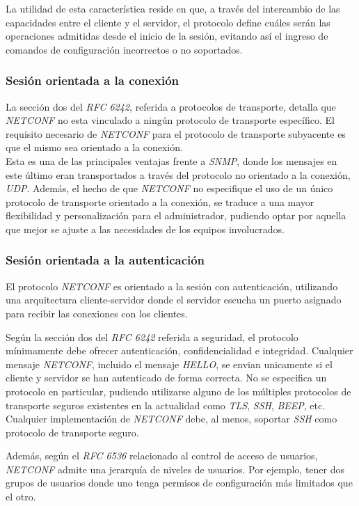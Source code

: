   La utilidad de esta característica reside en que, a través del intercambio de las capacidades entre el cliente y el servidor, el protocolo define cuáles serán las operaciones admitidas desde el inicio de la sesión, evitando así el ingreso de comandos de configuración incorrectos o no soportados. 


  \subsubsection{Sesión orientada a la conexión}
  La sección dos del \textit{RFC 6242}, referida a protocolos de transporte, detalla que \textit{NETCONF} no esta vinculado a ningún protocolo de transporte específico. El requisito necesario de \textit{NETCONF} para el protocolo de transporte subyacente es que el mismo sea orientado a la conexión. 
  \\

  Esta es una de las principales ventajas frente a \textit{SNMP}, donde los mensajes en este último eran transportados a través del protocolo no orientado a la conexión, \textit{UDP}. Además, el hecho de que \textit{NETCONF} no especifique el uso de un único protocolo de transporte orientado a la conexión, se traduce a una mayor flexibilidad y personalización para el administrador, pudiendo optar por aquella que mejor se ajuste a las necesidades de los equipos involucrados.


  \subsubsection{Sesión orientada a la autenticación}
  El protocolo \textit{NETCONF} es orientado a la sesión con autenticación, utilizando una arquitectura cliente-servidor donde el servidor escucha un puerto asignado para recibir las conexiones con los clientes. 

  Según la sección dos del \textit{RFC 6242} referida a seguridad, el protocolo mínimamente debe ofrecer autenticación, confidencialidad e integridad. Cualquier mensaje \textit{NETCONF}, incluido el mensaje \textit{HELLO}, se envian unicamente si el cliente y servidor se han autenticado de forma correcta. No se especifica un protocolo en particular, pudiendo utilizarse alguno de los múltiples protocolos de transporte seguros existentes en la actualidad como \textit{TLS}, \textit{SSH}, \textit{BEEP}, etc. Cualquier implementación de \textit{NETCONF} debe, al menos, soportar \textit{SSH} como protocolo de transporte seguro.

  Además, según el \textit{RFC 6536} relacionado al control de acceso de usuarios, \textit{NETCONF} admite una jerarquía de niveles de usuarios. Por ejemplo, tener dos grupos de usuarios donde uno tenga permisos de configuración más limitados que el otro.

